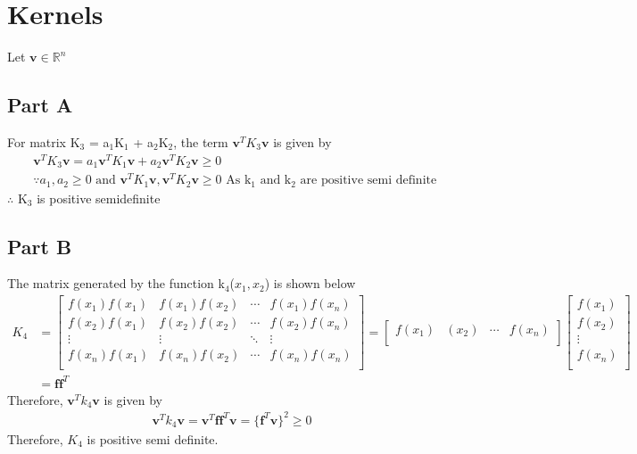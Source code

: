 \documentclass[11pt]{article}
\begin{document}
\section{Kernels}
Let $\boldsymbol{v} \in \mathbb{R}^n$ 
\subsection{Part A}
For matrix K$_3$ = a$_1$K$_1$ + a$_2$K$_2$, the term $\boldsymbol{v}^TK_3\boldsymbol{v}$ is given by
\begin{equation*}
	\begin{split}
		& \boldsymbol{v}^TK_3\boldsymbol{v} = a_1\boldsymbol{v}^TK_1\boldsymbol{v} + a_2\boldsymbol{v}^TK_2\boldsymbol{v} \geq 0 \\
		& \because a_1,a_2 \geq 0 \text{ and } \boldsymbol{v}^TK_1\boldsymbol{v},\boldsymbol{v}^TK_2\boldsymbol{v} \geq 0 \text{ As k$_1$ and k$_2$ are positive semi definite }
	\end{split}
\end{equation*}
$\therefore$ K$_3$ is positive semidefinite
\subsection{Part B}
The matrix generated by the function k$_4$($x_1,x_2$) is shown below
\begin{equation*}
	\begin{split}
		K_4 &= 
		\begin{bmatrix}
			f(x_1)f(x_1) & f(x_1)f(x_2) & \cdots & f(x_1)f(x_n) \\
			f(x_2)f(x_1) & f(x_2)f(x_2) & \cdots & f(x_2)f(x_n) \\
			\vdots & \vdots & \ddots & \vdots \\
			f(x_n)f(x_1) & f(x_n)f(x_2) & \cdots & f(x_n)f(x_n) \\
		\end{bmatrix}
		= 
		\begin{bmatrix}
		f(x_1) & (x_2) & \cdots & f(x_n) \\
		\end{bmatrix}
		\begin{bmatrix}
		f(x_1)\\
		f(x_2) \\
		\vdots\\
		f(x_n)\\
		\end{bmatrix}
		\\
		& = \boldsymbol{f}\boldsymbol{f}^T
	\end{split}
\end{equation*}
Therefore, $\boldsymbol{v}^Tk_4\boldsymbol{v}$ is given by
\begin{equation*}
	\begin{split}
		\boldsymbol{v}^Tk_4\boldsymbol{v} = \boldsymbol{v}^T\boldsymbol{f}\boldsymbol{f}^T\boldsymbol{v} = \{\boldsymbol{f}^T\boldsymbol{v}\}^2 \geq 0
	\end{split}
\end{equation*}
Therefore, $K_4$ is positive semi definite. 
\end{document}
